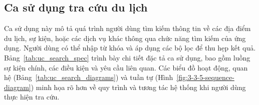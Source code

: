 \subsection{Ca sử dụng tra cứu du lịch}
\noindent Ca sử dụng này mô tả quá trình người dùng tìm kiếm thông tin về các địa điểm du lịch, sự kiện, hoặc các dịch vụ khác thông qua chức năng tìm kiếm của ứng dụng. Người dùng có thể nhập từ khóa và áp dụng các bộ lọc để thu hẹp kết quả. Bảng~\ref{tab:uc_search_spec} trình bày chi tiết đặc tả ca sử dụng, bao gồm luồng sự kiện chính, các điều kiện và yêu cầu liên quan. Các biểu đồ hoạt động, quan hệ (Bảng~\ref{tab:uc_search_diagrams}) và tuần tự (Hình~\ref{fig:3-3-5-sequence-diagram}) minh họa rõ hơn về quy trình và tương tác hệ thống khi người dùng thực hiện tra cứu.

